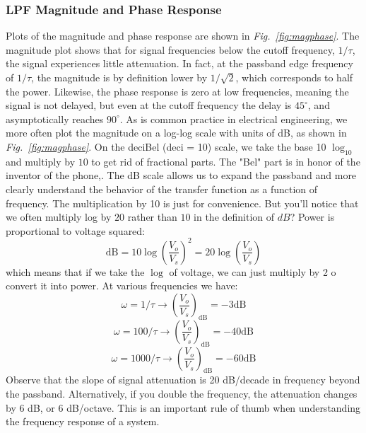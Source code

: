 \subsubsection{LPF Magnitude and Phase Response}
Plots of the magnitude and phase response are shown in \emph{Fig.~\ref{fig:magphase}}.  The magnitude plot shows that for signal frequencies below the cutoff frequency, $1/\tau$, the signal experiences little attenuation.  In fact, at the passband edge frequency of $1/\tau$, the magnitude is by definition lower by $1/\sqrt{2}$, which corresponds to half the power.  Likewise, the phase response is zero at low frequencies, meaning the signal is not delayed, but even at the cutoff frequency the delay is $45^\circ$, and asymptotically reaches $90^\circ$.
As is common practice in electrical engineering, we more often plot the magnitude on a log-log scale with units of dB,  as shown in \emph{Fig.~\ref{fig:magphase}}.  On the deciBel (deci = 10) scale, we take the base 10 $\log_{10}$ and multiply by $10$ to get rid of fractional parts.  The "Bel" part is in honor of the inventor of the phone,.  The dB scale allows us to expand the passband and more clearly understand the behavior of the transfer function as a function of frequency.  The multiplication by 10 is just for convenience.
But you'll notice that we often multiply log by $20$ rather than $10$ in the definition of $dB$?   Power is proportional to voltage squared:
    \begin{equation}
        \mathrm{dB} = 10 \log\left( \frac{V_o}{V_s} \right)^2 = 20 \log\left( \frac{V_o}{V_s} \right)
    \end{equation}
which means that if we take the $\log$ of voltage, we can just multiply by 2 o convert it into power.
At various frequencies we have:
    \begin{equation}
        \omega = 1/\tau \rightarrow \left( \frac{V_o}{V_s} \right)_{\mathrm{dB}} = -3 \mathrm{dB}
    \end{equation}
    \begin{equation}
        \omega = 100/\tau \rightarrow \left( \frac{V_o}{V_s} \right)_{\mathrm{dB}} = -40 \mathrm{dB}
    \end{equation}
    \begin{equation}
        \omega = 1000/\tau \rightarrow \left( \frac{V_o}{V_s} \right)_{\mathrm{dB}} = -60 \mathrm{dB}
    \end{equation}
Observe that the slope of signal attenuation is 20 dB/decade in frequency beyond the passband.   Alternatively, if you double the frequency, the attenuation changes by 6 dB, or 6 dB/octave.  This is an important rule of thumb when understanding the frequency response of a system.

